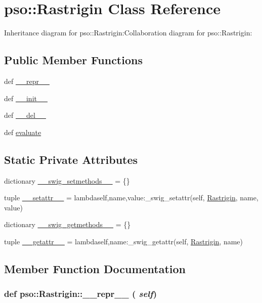 \hypertarget{classpso_1_1Rastrigin}{
\section{pso::Rastrigin Class Reference}
\label{classpso_1_1Rastrigin}
}
Inheritance diagram for pso::Rastrigin:Collaboration diagram for pso::Rastrigin:\subsection*{Public Member Functions}
\begin{CompactItemize}
\item 
def \hyperlink{classpso_1_1Rastrigin_e20e3e7a699b801c9fa78b531ae355c1}{\_\-\_\-repr\_\-\_\-}
\item 
def \hyperlink{classpso_1_1Rastrigin_6a38343c1d2870431835ecb1a82d43b2}{\_\-\_\-init\_\-\_\-}
\item 
def \hyperlink{classpso_1_1Rastrigin_4ec1ea0cb3ef15cb5355eb5b36cfeabf}{\_\-\_\-del\_\-\_\-}
\item 
def \hyperlink{classpso_1_1Rastrigin_6aaed0f64f959a9666321763e3ff8efe}{evaluate}
\end{CompactItemize}
\subsection*{Static Private Attributes}
\begin{CompactItemize}
\item 
dictionary \hyperlink{classpso_1_1Rastrigin_6669f18ee53e453abd57a7414869091c}{\_\-\_\-swig\_\-setmethods\_\-\_\-} = \{\}
\item 
tuple \hyperlink{classpso_1_1Rastrigin_cf1c6ea103beabbdb11abbd8a0e6d1fc}{\_\-\_\-setattr\_\-\_\-} = lambdaself,name,value:\_\-swig\_\-setattr(self, \hyperlink{classpso_1_1Rastrigin}{Rastrigin}, name, value)
\item 
dictionary \hyperlink{classpso_1_1Rastrigin_ff2a6f19b803ab401dc52374ea84bf27}{\_\-\_\-swig\_\-getmethods\_\-\_\-} = \{\}
\item 
tuple \hyperlink{classpso_1_1Rastrigin_6301c8bda4feb384df57d0242ca4962e}{\_\-\_\-getattr\_\-\_\-} = lambdaself,name:\_\-swig\_\-getattr(self, \hyperlink{classpso_1_1Rastrigin}{Rastrigin}, name)
\end{CompactItemize}


\subsection{Member Function Documentation}
\hypertarget{classpso_1_1Rastrigin_e20e3e7a699b801c9fa78b531ae355c1}{
\subsubsection{\setlength{\rightskip}{0pt plus 5cm}def pso::Rastrigin::\_\-\_\-repr\_\-\_\- ( {\em self})}}
\label{classpso_1_1Rastrigin_e20e3e7a699b801c9fa78b531ae355c1}




